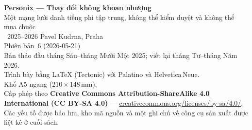 \thispagestyle{empty}
\ifdefined\printmode\vspace*{\fill}\else{}\fi
\begin{flushleft}\small\sffamily
\textbf{Personix --- Thay đổi không khoan nhượng}\\[0.3em]
Một mạng lưới danh tiếng phi tập trung, không thể kiểm duyệt và không thể mua chuộc\\[1.4em]

\textcopyright\ 2025--2026 Pavel Kudrna, Praha\\[0.4em]

Phiên bản~6 (2026-05-21)\\
Bản thảo đầu tháng Sáu--tháng Mười Một 2025; viết lại tháng Tư--tháng Năm 2026.\\[1.4em]

Trình bày bằng \LaTeX{} (Tectonic) với Palatino và Helvetica\,Neue.\\
Khổ A5 ngang (210\,$\times$\,148\,mm).\\[1.4em]

Cấp phép theo \textbf{Creative Commons Attribution-ShareAlike 4.0
International (CC BY-SA 4.0)} ---
\href{https://creativecommons.org/licenses/by-sa/4.0/}{creativecommons.org/licenses/by-sa/4.0/}.
Các yếu tố được bảo lưu, kho mã nguồn và một ghi chú về công cụ sản xuất
được liệt kê ở cuối sách.
\end{flushleft}
\ifdefined\printmode\else{}\fi
\clearpage
